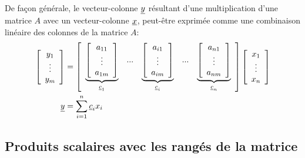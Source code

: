 De façon générale, le vecteur-colonne $\underline{y}$ résultant d'une multiplication d'une matrice $A$ avec un vecteur-colonne $\underline{x}$, peut-être exprimée comme une combinaison linéaire des colonnes de la matrice $A$:
%
\begin{align}
%
\left[ \begin{array}{c} 
	y_1 \\ \vdots \\ y_m
\end{array} \right] 
%
&= 
%
\left[ \begin{array}{c c c c c} 
\underbrace{\left[ \begin{array}{c} 
	a_{11} \\ \vdots \\ a_{1m}
\end{array} \right]}_{\col{c}_1}
& ... &
\underbrace{\left[ \begin{array}{c} 
	a_{i1} \\ \vdots \\ a_{im}
\end{array} \right]}_{\col{c}_i}
& ... &
\underbrace{\left[ \begin{array}{c} 
	a_{n1} \\ \vdots \\ a_{nm}
\end{array} \right]}_{\col{c}_n}
\end{array} \right] 
%
\left[ \begin{array}{c} 
	x_1 \\ \vdots \\ x_n
\end{array} \right]  \\
%
%
\col{y}
&= \sum_{i=1}^{n}{ \col{c}_i x_i}
\end{align}
%

\subsection{Produits scalaires avec les rangés de la matrice} 
\label{sec:combveccol}

